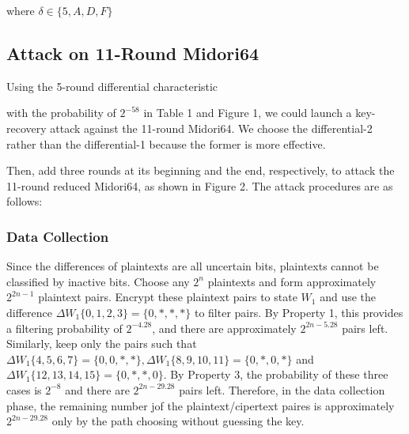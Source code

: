 \documentclass[journal=tosc,preprint]{iacrtrans}
\begin{document}
    where $\delta \in \{5, A, D, F\}$
    \newline


    

    \subsection{Attack on 11-Round Midori64}

    Using the 5-round differential characteristic

    \begin{center}
    \end{center}
    with the probability of $2^{-58}$ in Table 1 and Figure 1, we could launch a key-recovery attack against the 11-round Midori64. We choose the differential-2 rather than the differential-1 because the former is more effective.

    Then, add three rounds at its beginning and the end, respectively, to attack the 11-round reduced Midori64, as shown in Figure 2. The attack procedures are as follows:

    \subsubsection{Data Collection}
    Since the differences of plaintexts are all uncertain bits, plaintexts cannot be classified by inactive bits. Choose any $2^n$ plaintexts and form approximately $2^{2n-1}$ plaintext pairs. Encrypt these plaintext pairs to state $W_1$ and use the difference $\Delta W_1\{0, 1, 2, 3\} = \{0, \ast, \ast, \ast\}$ to filter pairs. By Property 1, this provides a filtering probability of $2^{-4.28}$, and there are approximately $2^{2n-5.28}$ pairs left. Similarly, keep only the pairs such that $\Delta W_1 \{4, 5, 6, 7\} = \{0, 0, \ast, \ast \}, \Delta W_1 \{8, 9, 10, 11\} = \{0, \ast, 0, \ast \}$ and $\Delta W_1 \{12, 13, 14, 15\} = \{0, \ast, \ast, 0\}$. By Property 3, the probability of these three cases is $2^{-8}$ and there are $2^{2n - 29.28}$ pairs left. Therefore, in the data collection phase, the remaining number jof the plaintext/cipertext paires is approximately $2^{2n - 29.28}$ only by the path choosing without guessing the key.
    
\end{document}
